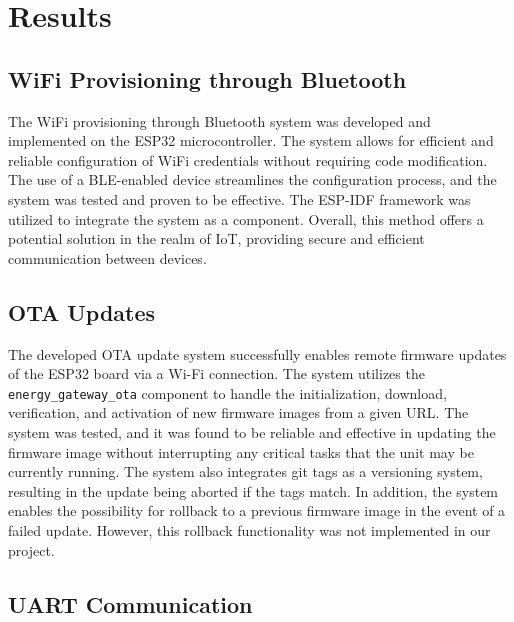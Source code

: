 \section{Results}\label{sec:results}

\subsection{WiFi Provisioning through Bluetooth}

The WiFi provisioning through Bluetooth system was developed and implemented on the ESP32 microcontroller. The system allows for efficient and reliable configuration of WiFi credentials without requiring code modification. The use of a BLE-enabled device streamlines the configuration process, and the system was tested and proven to be effective. The ESP-IDF framework was utilized to integrate the system as a component. Overall, this method offers a potential solution in the realm of IoT, providing secure and efficient communication between devices.

\subsection{OTA Updates}

The developed OTA update system successfully enables remote firmware updates of the ESP32 board via a Wi-Fi connection. The system utilizes the \texttt{energy\_gateway\_ota} component to handle the initialization, download, verification, and activation of new firmware images from a given URL. The system was tested, and it was found to be reliable and effective in updating the firmware image without interrupting any critical tasks that the unit may be currently running. The system also integrates git tags as a versioning system, resulting in the update being aborted if the tags match. In addition, the system enables the possibility for rollback to a previous firmware image in the event of a failed update. However, this rollback functionality was not implemented in our project.

\subsection{UART Communication}

